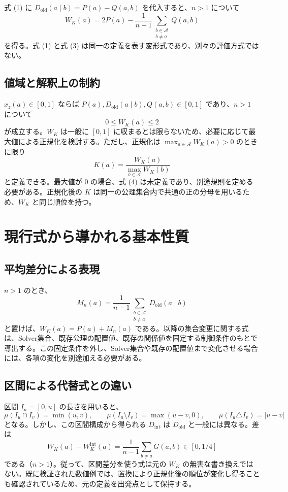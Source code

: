 \documentclass[a4paper,11pt]{ltjsarticle}
\begin{document}
式 (1) に $D_{\mathrm{old}}(a\mid b)=P(a)-Q(a,b)$ を代入すると、$n>1$ について
\[
\boxed{
W_K(a)=2P(a)-\frac{1}{n-1}
\sum_{\substack{b\in\mathcal{A}\\b\ne a}}Q(a,b)
}
\tag{3}
\]
を得る。式 (1) と式 (3) は同一の定義を表す変形式であり、別々の評価方式ではない。

\subsection{値域と解釈上の制約}
$x_z(a)\in[0,1]$ ならば $P(a),D_{\mathrm{old}}(a\mid b),Q(a,b)\in[0,1]$ であり、$n>1$ について
\[
0\le W_K(a)\le2
\]
が成立する。$W_K$ は一般に $[0,1]$ に収まるとは限らないため、必要に応じて最大値による正規化を検討する。ただし、正規化は $\max_{a\in\mathcal{A}}W_K(a)>0$ のときに限り
\[
K(a)=\frac{W_K(a)}{\max_{b\in\mathcal{A}}W_K(b)}
\tag{4}
\]
と定義できる。最大値が $0$ の場合、式 (4) は未定義であり、別途規則を定める必要がある。正規化後の $K$ は同一の公理集合内で共通の正の分母を用いるため、$W_K$ と同じ順位を持つ。

\section{現行式から導かれる基本性質}
\subsection{平均差分による表現}
$n>1$ のとき、
\[
M_n(a)=\frac{1}{n-1}\sum_{\substack{b\in\mathcal{A}\\b\ne a}}
D_{\mathrm{old}}(a\mid b)
\]
と置けば、$W_K(a)=P(a)+M_n(a)$ である。以降の集合変更に関する式は、Solver集合、既存公理の配置値、既存の関係値を固定する制御条件のもとで導出する。この固定条件を外し、Solver集合や既存の配置値まで変化させる場合には、各項の変化を別途加える必要がある。

\subsection{区間による代替式との違い}
区間 $I_u=[0,u]$ の長さを用いると、
\[
\mu(I_u\cap I_v)=\min(u,v),\qquad
\mu(I_u\setminus I_v)=\max(u-v,0),\qquad
\mu(I_u\triangle I_v)=|u-v|
\]
となる。しかし、この区間構成から得られる $D_{\mathrm{int}}$ は $D_{\mathrm{old}}$ と一般には異なる。差は
\[
W_K(a)-W_K^{\mathrm{int}}(a)
=\frac{1}{n-1}\sum_{b\ne a}G(a,b)\in[0,1/4]
\]
である（$n>1$）。従って、区間差分を使う式は元の $W_K$ の無害な書き換えではない。既に検証された数値例では、置換により正規化後の順位が変化し得ることも確認されているため、元の定義を出発点として保持する。
\end{document}
